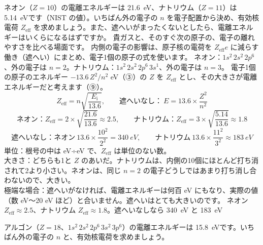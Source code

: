 \label{ph:原-7:ex1}
\begin{phreidai}
ネオン（$Z=10$）の電離エネルギーは \qty{21.6}{eV}、ナトリウム（$Z=11$）は \qty{5.14}{eV}です（NIST の値）。いちばん外の電子の $n$ を電子配置から決め、有効核電荷 $Z_{\mathrm{eff}}$ を求めましょう。また、遮へいがまったくないとしたら、電離エネルギーはいくらになるはずですか。
\phbamen
貴ガスと、そのすぐ次の原子の、電子の離れやすさを比べる場面です。
\phmushi
内側の電子の影響は、原子核の電荷を $Z_{\mathrm{eff}}e$ に減らす働き（遮へい）にまとめ、電子1個の原子の式を使います。
\phzu
ネオン：$1s^2\,2s^2\,2p^6$、外の電子は $n=2$。ナトリウム：$1s^2\,2s^2\,2p^6\,3s^1$、外の電子は $n=3$。
\phriyu
電子1個の原子のエネルギー $-13.6\,Z^2/n^2$ eV（③）の $Z$ を $Z_{\mathrm{eff}}$ とし、その大きさが電離エネルギーだと考えます（⑨）。
\phtateru
\[ Z_{\mathrm{eff}}=n\sqrt{\frac{E_{\mathrm i}}{13.6}},\qquad \text{遮へいなし：}\ E=13.6\times\frac{Z^2}{n^2} \]
\phtoku
\[ \text{ネオン：}Z_{\mathrm{eff}}=2\times\sqrt{\frac{21.6}{13.6}}\approx2.5,\qquad \text{ナトリウム：}Z_{\mathrm{eff}}=3\times\sqrt{\frac{5.14}{13.6}}\approx1.8 \]
\[ \text{遮へいなし：ネオン}\ 13.6\times\frac{10^2}{2^2}=\qty{340}{eV},\qquad \text{ナトリウム}\ 13.6\times\frac{11^2}{3^2}\approx\qty{183}{eV} \]
\phtashikame
単位：根号の中は eV÷eV で、$Z_{\mathrm{eff}}$ は単位のない数。\\
大きさ：どちらも1と $Z$ のあいだ。ナトリウムは、内側の10個にほとんど打ち消されて2より小さい。ネオンは、同じ $n=2$ の電子どうしではあまり打ち消し合わないので、大きい。\\
極端な場合：遮へいがなければ、電離エネルギーは何百 eV にもなり、実際の値（数 eV〜20 eV ほど）と合いません。遮へいはとても大きいのです。
\kotae ネオン $Z_{\mathrm{eff}}\approx2.5$、ナトリウム $Z_{\mathrm{eff}}\approx1.8$。遮へいなしなら \qty{340}{eV} と \qty{183}{eV}
\end{phreidai}
\begin{jibun}
アルゴン（$Z=18$、$1s^2\,2s^2\,2p^6\,3s^2\,3p^6$）の電離エネルギーは \qty{15.8}{eV}です。いちばん外の電子の $n$ と、有効核電荷を求めましょう。
\end{jibun}

